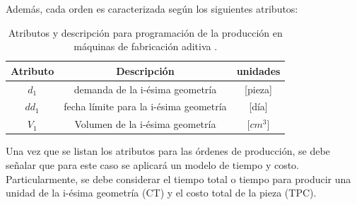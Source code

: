 \begin{description}
 Además, cada orden es caracterizada según los siguientes atributos:\\

\begin{table}[H]
\centering

\begin{tabular}{|c|c|c|}

\hline
Atributo & Descripción & unidades\\
\hline 
$d_1$ & demanda de la i-ésima geometría  & [pieza] \\ 
\hline 
$dd_1$ & fecha límite para la i-ésima geometría & [día] \\ 
\hline 
$V_1$ & Volumen de la i-ésima geometría & [$cm^3$] \\ 
\hline 

\end{tabular} 
\caption{Atributos y descripción para programación de la producción en máquinas de fabricación aditiva \citep{fera2018}.}
\end{table}

Una vez que se listan los atributos para las órdenes de producción, se debe señalar que para  este caso se aplicará un modelo de tiempo y costo. Particularmente, se debe considerar el tiempo total o tiempo para producir una unidad de la i-ésima geometría (CT) y el costo total de la pieza (TPC).



\end{description}






